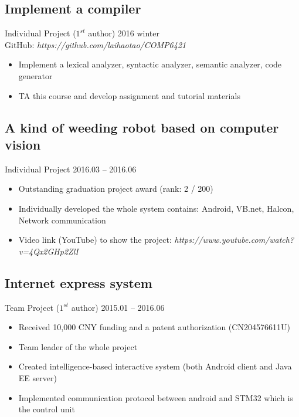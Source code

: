 \documentclass[11pt,a4paper,sans]{moderncv}
\begin{document}
\subsection{Implement a compiler}
Individual Project ($1^{st}$ author) \hfill 2016 winter \\
GitHub: {\textit{https://github.com/laihaotao/COMP6421}}
\vspace{2pt}
\begin{itemize}
\item Implement a lexical analyzer, syntactic analyzer, semantic analyzer, code generator
\item TA this course and develop assignment and tutorial materials
\end{itemize}

\subsection{A kind of weeding robot based on computer vision}
Individual Project \hfill 2016.03 -- 2016.06
\vspace{2pt}
\begin{itemize}
\item Outstanding graduation project award (rank: 2 / 200)
\item Individually developed the whole system contains: Android, VB.net, Halcon, Network communication
\item Video link (YouTube) to show the project: {\textit{https://www.youtube.com/watch?v=4Qx2GHp2ZlI}}
\end{itemize}

\subsection{Internet express system}
Team Project ($1^{st}$ author) \hfill 2015.01 -- 2016.06
\vspace{2pt}
\begin{itemize}
\item Received 10,000 CNY funding and a patent authorization (CN204576611U)
\item Team leader of the whole project
\item Created intelligence-based interactive system (both Android client and Java EE server)
\item Implemented communication protocol between android and STM32 which is the control unit
\end{itemize}
\end{document}
